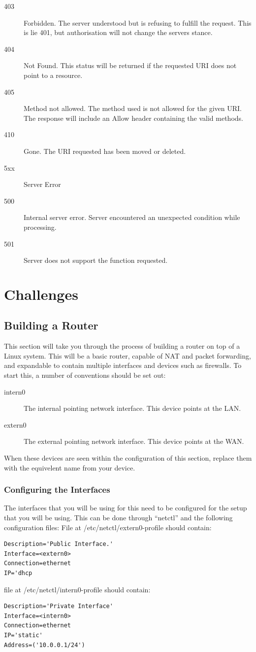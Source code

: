 \documentclass[a4paper,11pt]{report}
\begin{document}
\begin{description}
			\item[403] Forbidden. 
				The server understood but is refusing to fulfill the request. 
				This is lie 401, but authorisation will not change the servers stance. 
			\item[404] Not Found. 
				This status will be returned if the requested URI does not point to a resource. 
			\item[405] Method not allowed. 
				The method used is not allowed for the given URI. 
				The response will include an Allow header containing the valid methods. 
			\item[410] Gone.
				The URI requested has been moved or deleted. 
			\item[5xx] Server Error
			\item[500] Internal server error.
				Server encountered an unexpected condition while processing. 
			\item[501] Server does not support the function requested. 
		\end{description}
	\section{Challenges}
		\subsection{Building a Router}
			This section will take you through the process of building a router on top of a Linux system. 
			This will be a basic router, capable of NAT and packet forwarding, and expandable to contain multiple interfaces and devices such as firewalls. 
			To start this, a number of conventions should be set out:
			\begin{description}
				\item[intern0] The internal pointing network interface. 
					This device points at the LAN. 
				\item[extern0] The external pointing network interface. 
					This device points at the WAN. 
			\end{description}
			When these devices are seen within the configuration of this section, replace them with the equivelent name from your device. 

			\subsubsection{Configuring the Interfaces}
				The interfaces that you will be using for this need to be configured for the setup that you will be using. 
				This can be done through ``netctl'' and the following configuration files:
				File at /etc/netctl/extern0-profile should contain:
				\begin{verbatim}
Description='Public Interface.'
Interface=<extern0>
Connection=ethernet
IP='dhcp
				\end{verbatim}
				file at /etc/netctl/intern0-profile should contain:
				\begin{verbatim}
Description='Private Interface'
Interface=<intern0>
Connection=ethernet
IP='static'
Address=('10.0.0.1/24')
				\end{verbatim}
				
\end{document}
